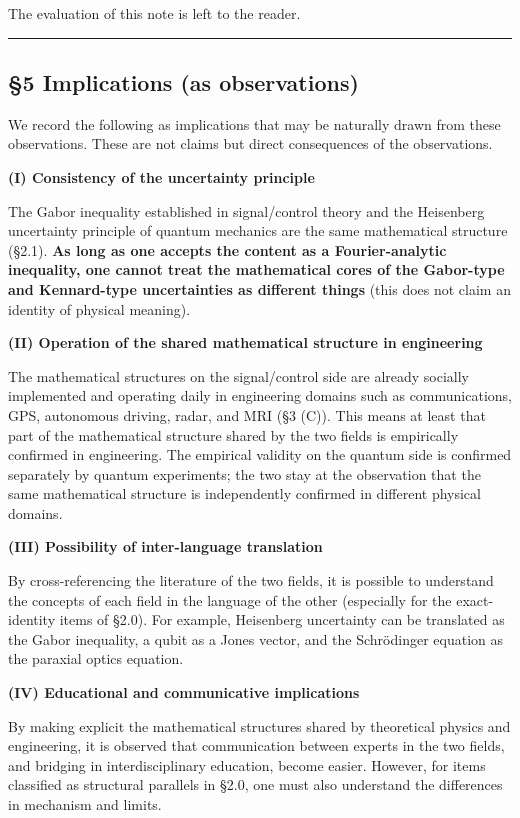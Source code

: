 \documentclass[
]{article}
\begin{document}
The evaluation of this note is left to the reader.

\begin{center}\rule{0.5\linewidth}{0.5pt}\end{center}

\subsection{§5 Implications (as
observations)}\label{implications-as-observations}

We record the following as implications that may be naturally drawn from
these observations. These are not claims but direct consequences of the
observations.

\textbf{(I) Consistency of the uncertainty principle}

The Gabor inequality established in signal/control theory and the
Heisenberg uncertainty principle of quantum mechanics are the same
mathematical structure (§2.1). \textbf{As long as one accepts the
content as a Fourier-analytic inequality, one cannot treat the
mathematical cores of the Gabor-type and Kennard-type uncertainties as
different things} (this does not claim an identity of physical meaning).

\textbf{(II) Operation of the shared mathematical structure in
engineering}

The mathematical structures on the signal/control side are already
socially implemented and operating daily in engineering domains such as
communications, GPS, autonomous driving, radar, and MRI (§3 (C)). This
means at least that part of the mathematical structure shared by the two
fields is empirically confirmed in engineering. The empirical validity
on the quantum side is confirmed separately by quantum experiments; the
two stay at the observation that the same mathematical structure is
independently confirmed in different physical domains.

\textbf{(III) Possibility of inter-language translation}

By cross-referencing the literature of the two fields, it is possible to
understand the concepts of each field in the language of the other
(especially for the exact-identity items of §2.0). For example,
Heisenberg uncertainty can be translated as the Gabor inequality, a
qubit as a Jones vector, and the Schrödinger equation as the paraxial
optics equation.

\textbf{(IV) Educational and communicative implications}

By making explicit the mathematical structures shared by theoretical
physics and engineering, it is observed that communication between
experts in the two fields, and bridging in interdisciplinary education,
become easier. However, for items classified as structural parallels in
§2.0, one must also understand the differences in mechanism and limits.
\end{document}

